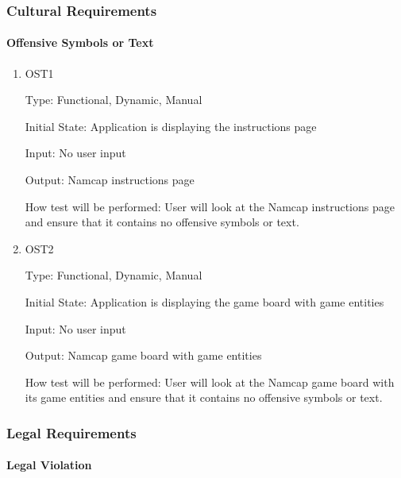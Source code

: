 \documentclass[12pt, titlepage]{article}
\begin{document}
\subsubsection{Cultural Requirements}

\paragraph{Offensive Symbols or Text}

\begin{enumerate}

\item{OST1\\}

Type: Functional, Dynamic, Manual
					
Initial State: Application is displaying the instructions page
					
Input: No user input
					
Output: Namcap instructions page
					
How test will be performed: User will look at the Namcap instructions page and ensure that it contains no offensive symbols or text.
					
\item{OST2\\}

Type: Functional, Dynamic, Manual
					
Initial State: Application is displaying the game board with game entities
					
Input: No user input
					
Output: Namcap game board with game entities
					
How test will be performed: User will look at the Namcap game board with its game entities and ensure that it contains no offensive symbols or text.

\end{enumerate}

\subsubsection{Legal Requirements}

\paragraph{Legal Violation}
\end{document}
